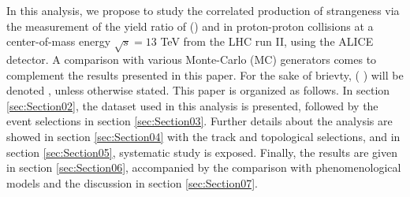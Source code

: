 In this analysis, we propose to study the correlated production of strangeness via the measurement of the yield ratio of (\rmOmegas) and \rmPhiMes in proton-proton collisions at a center-of-mass energy $\sqrt{s} = 13 $ TeV from the LHC run II, using the ALICE detector. A comparison with various Monte-Carlo (MC) generators comes to complement the results presented in this paper. For the sake of brievty, ( \rmOmegas) will be denoted \rmOmegaPM, unless otherwise stated. This paper is organized as follows. In section \ref{sec:Section02}, the dataset used in this analysis is presented, followed by the event selections in section \ref{sec:Section03}. Further details about the analysis are showed in section \ref{sec:Section04} with the track and topological selections, and in section \ref{sec:Section05}, systematic study is exposed. Finally, the results are given in section \ref{sec:Section06}, accompanied by the comparison with phenomenological models and the discussion in section \ref{sec:Section07}.



